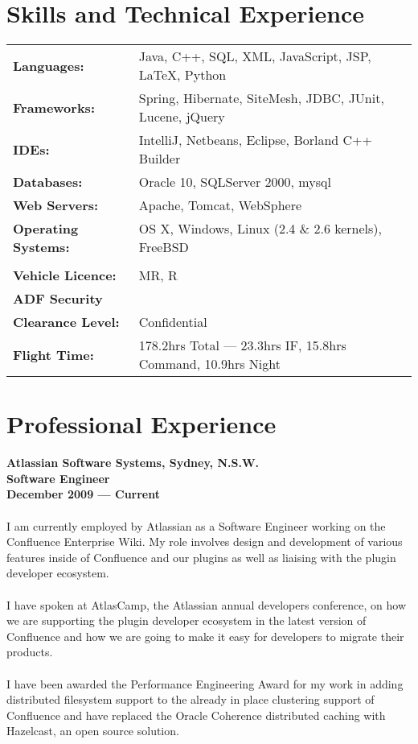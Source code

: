 \documentclass[a4paper]{article}
\begin{document}
\section*{Skills and Technical Experience}
\begin{tabular}{l l}
\textbf{Languages:} & Java, C++, SQL, XML, JavaScript, JSP, \LaTeX, Python\\
\textbf{Frameworks:} & Spring, Hibernate, SiteMesh, JDBC, JUnit, Lucene, jQuery\\
\textbf{IDEs:} & IntelliJ, Netbeans, Eclipse, Borland C++ Builder\\
\textbf{Databases:} & Oracle 10, SQLServer 2000, mysql\\
\textbf{Web Servers:} & Apache, Tomcat, WebSphere\\
\textbf{Operating Systems:} & OS X, Windows, Linux (2.4 \& 2.6 kernels), FreeBSD\\
&\\
\textbf{Vehicle Licence:}&MR, R\\
\textbf{ADF Security}&\\\textbf{Clearance Level:}&Confidential\\
\textbf{Flight Time:}&178.2hrs Total --- 23.3hrs IF, 15.8hrs Command, 10.9hrs Night
\end{tabular}

\vspace{5pt}
\section*{Professional Experience}

\textbf{Atlassian Software Systems, Sydney, N.S.W.\\Software Engineer\\December 2009 --- Current}\\\\
I am currently employed by Atlassian as a Software Engineer working on the Confluence Enterprise Wiki. My role involves design and development of various features inside of Confluence and our plugins as well as liaising with the plugin developer ecosystem.\\\\
I have spoken at AtlasCamp, the Atlassian annual developers conference, on how we are supporting the plugin developer ecosystem in the latest version of Confluence and how we are going to make it easy for developers to migrate their products.\\\\
I have been awarded the Performance Engineering Award for my work in adding distributed filesystem support to the already in place clustering support of Confluence and have replaced the Oracle Coherence distributed caching with Hazelcast, an open source solution.
\end{document}
